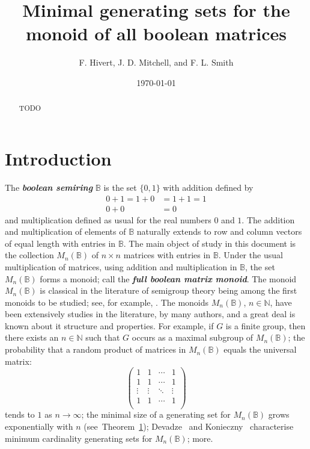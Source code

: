 \documentclass[11pt]{article}
\title{Minimal generating sets for the monoid of all boolean matrices}
\author{F. Hivert, J. D. Mitchell, and F. L. Smith}
\date{\today}
\newcommand{\defn}[1]{\textbf{\textit{#1}}}
\numberwithin{equation}{section}
\renewcommand{\to}{\longrightarrow}
\newcommand{\B}{\mathbb{B}}
\newcommand{\Bn}{M_n(\B)}
\newcommand{\N}{\mathbb{N}}
\begin{document}
\maketitle

\begin{abstract}
  TODO
\end{abstract}

\section{Introduction}


The \defn{boolean semiring} $\B$ is the set $\{0, 1\}$ with addition defined by 
\begin{align*}
  0 + 1 = 1 + 0 &= 1 + 1 = 1 \\
  0 + 0 &= 0
\end{align*}
and multiplication defined as usual for the real numbers $0$ and $1$.  The
addition and multiplication of elements of $\B$ naturally extends to row and
column vectors of equal length with entries in $\B$.  The main object of study
in this document is the collection $\Bn$ of $n\times n$ matrices with entries
in $\B$. Under the usual multiplication of matrices, using addition and
multiplication in $\B$, the set $\Bn$ forms a monoid; call the \defn{full
boolean matrix monoid}. The monoid $\Bn$ is classical in the literature of
semigroup theory being among the first monoids to be studied; see, for example,
\cite{}. The monoids $\Bn$, $n\in \N$, have been extensively studies in the
literature, by many authors, and a great deal is known about it structure and
properties. For example, if $G$ is a finite group, then there exists an $n\in
\N$ such that $G$ occurs as a maximal subgroup of $\Bn$; the probability that a
random product of matrices in $\Bn$ equals the universal matrix:
\begin{equation*} 
  \begin{pmatrix}
  1 & 1 & \cdots & 1\\
  1 & 1 & \cdots & 1\\ 
  \vdots & \vdots & \ddots & \vdots\\
  1 & 1 & \cdots & 1\\ 
\end{pmatrix} 
\end{equation*} 
tends to $1$ as $n\to \infty$; the minimal size of a generating set for $\Bn$
grows exponentially with $n$ (see~Theorem~\ref{}); Devadze~\cite{Devadze1968aa} and
Konieczny~\cite{} characterise minimum cardinality generating sets for $\Bn$; 
more.
\end{document}
